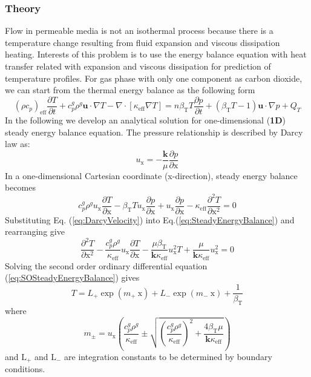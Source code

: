 \subsubsection*{\upshape\textbf{Theory}}
Flow in permeable media is not an isothermal process because there is a temperature change resulting from fluid expansion and viscous dissipation heating. Interests of this problem is to use the energy balance equation with heat transfer related with expansion and viscous dissipation for prediction of temperature profiles. For gas phase with only one component as carbon dioxide, we can start from the thermal energy balance as the following form
\begin{equation}
\left(\rho c_p\right)_{\mathrm {eff}} \frac{\partial T}{\partial t} + c_p^g \rho^g \mathbf u \cdot \nabla T - \nabla \cdot \left[\kappa_{\mathrm {eff}} \nabla T\right] = n \beta_{\mathrm T} T \frac{\partial p}{\partial t} + \left(\beta_{\mathrm T} T-1\right) \mathbf u \cdot \nabla p + Q_T
\label{eq:EnergyBalance}
\end{equation}
In the following we develop an analytical solution for one-dimensional (\textbf{1D}) steady energy balance equation.
The pressure relationship is described by Darcy law as:
\begin{equation}
u_{\mathrm x}=-\frac{\mathbf k}{\mu} \frac{\partial p}{\partial {\mathrm x}}
\label{eq:DarcyVelocity}
\end{equation}
In a one-dimensional Cartesian coordinate (x-direction), steady energy balance becomes
\begin{equation}
c_p^g\rho^g u_{\mathrm x}\frac{\partial T}{\partial {\mathrm x}}- \beta_{\mathrm T} T u_{\mathrm x} \frac{\partial p}{\partial {\mathrm x}}+u_{\mathrm x} \frac{\partial p}{\partial {\mathrm x}}- \kappa_{\mathrm {eff} }\frac{\partial^2 T}{\partial {\mathrm x}^2} =0
\label{eq:SteadyEnergyBalance}
\end{equation}
Substituting Eq. (\ref{eq:DarcyVelocity}) into Eq.(\ref{eq:SteadyEnergyBalance}) and rearranging give
\begin{equation}
\frac{\partial^2 T}{\partial {\mathrm x}^2}-\frac{c_p^g\rho^g}{\kappa_{\mathrm {eff} }} u_{\mathrm x}\frac{\partial T}{\partial {\mathrm x}}- \frac{\mu \beta_{\mathrm T}}{\mathbf k \kappa_{\mathrm {eff} }} u^2_{\mathrm x} T + \frac{\mu }{\mathbf k \kappa_{\mathrm {eff} }} u^2_{\mathrm x} =0
\label{eq:SOSteadyEnergyBalance}
\end{equation}
Solving the second order ordinary differential equation (\ref{eq:SOSteadyEnergyBalance}) gives
\begin{equation}
T=L_+\exp(m_+~\mathrm x)+L_-\exp(m_-~\mathrm x)+\frac{1}{\beta_{\mathrm T}}
\label{eq:AnlyticalSolution}
\end{equation}
where 
\begin{equation*}
m_{\pm}=u_{\mathrm x}\left(\frac{c_p^g\rho^g}{\kappa_{\mathrm {eff} }}\pm\sqrt{\left(\frac{c_p^g\rho^g}{\kappa_{\mathrm {eff} }}\right)^2 + \frac{4\beta_{\mathrm T}\mu}{\mathbf k \kappa_{\mathrm {eff} }}} \right)
\label{eq:AnlyticalSolution}
\end{equation*}
 and $\mathrm {L_+}$ and $\mathrm {L_-}$ are integration constants to be determined by boundary conditions.
 
